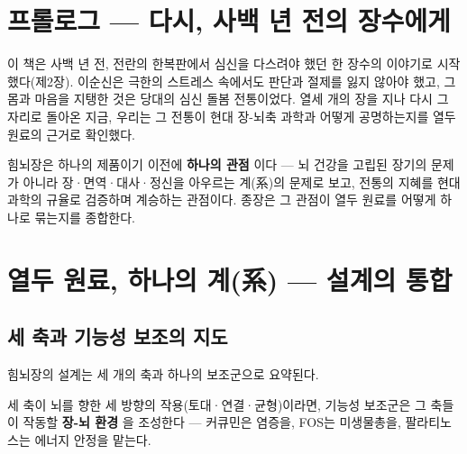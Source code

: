 \documentclass[11pt,oneside]{book}
\begin{document}
\section{프롤로그 — 다시, 사백 년 전의 장수에게}
이 책은 사백 년 전, 전란의 한복판에서 심신을 다스려야 했던 한 장수의 이야기로 시작했다(제2장). 이순신은 극한의 스트레스 속에서도 판단과 절제를 잃지 않아야 했고, 그 몸과 마음을 지탱한 것은 당대의 심신 돌봄 전통이었다. 열세 개의 장을 지나 다시 그 자리로 돌아온 지금, 우리는 그 전통이 현대 장-뇌축 과학과 어떻게 공명하는지를 열두 원료의 근거로 확인했다.

힘뇌장은 하나의 제품이기 이전에 \textbf{하나의 관점} 이다 — 뇌 건강을 고립된 장기의 문제가 아니라 장·면역·대사·정신을 아우르는 계(系)의 문제로 보고, 전통의 지혜를 현대 과학의 규율로 검증하며 계승하는 관점이다. 종장은 그 관점이 열두 원료를 어떻게 하나로 묶는지를 종합한다.

\section{열두 원료, 하나의 계(系) — 설계의 통합}
\subsection{세 축과 기능성 보조의 지도}
힘뇌장의 설계는 세 개의 축과 하나의 보조군으로 요약된다.

\vspace{2pt}\vspace{3pt}

세 축이 뇌를 향한 세 방향의 작용(토대·연결·균형)이라면, 기능성 보조군은 그 축들이 작동할 \textbf{장-뇌 환경} 을 조성한다 — 커큐민은 염증을, FOS는 미생물총을, 팔라티노스는 에너지 안정을 맡는다.
\end{document}

